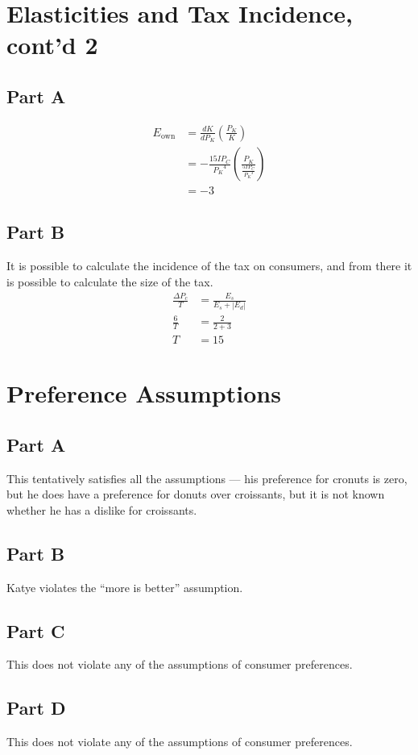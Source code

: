 \documentclass[8pt]{extarticle}
\newcommand{\plain}[1]{\textrm{#1}}
\begin{document}
{\section*{Elasticities and Tax Incidence, cont'd 2}
\subsection*{Part A}
\begin{align*}
	E_{\plain{own}} &= \frac{dK}{dP_{K}}\left(\frac{P_K}{K}\right)\\
	&= -\frac{15IP_C}{{P_K}^4}\left(\frac{P_K}{\frac{5IP_C}{{P_K}^3}}\right)\\
	&= -3
\end{align*}
\subsection*{Part B}
It is possible to calculate the incidence of the tax on consumers, and from there it is possible to calculate the size of the tax.
\begin{align*}
	\frac{\Delta P_{c}}{T} &= \frac{E_s}{E_s + |E_d|}\\
	\frac{6}{T} &= \frac{2}{2 + 3}\\
	T &= \boxed{15}
\end{align*}
\section*{Preference Assumptions}
\subsection*{Part A}
This tentatively satisfies all the assumptions — his preference for cronuts is zero, but he does have a preference for donuts over croissants, but it is not known whether he has a dislike for croissants.
\subsection*{Part B}
Katye violates the ``more is better'' assumption.
\subsection*{Part C}
This does not violate any of the assumptions of consumer preferences.
\subsection*{Part D}
This does not violate any of the assumptions of consumer preferences.
}
\end{document}
